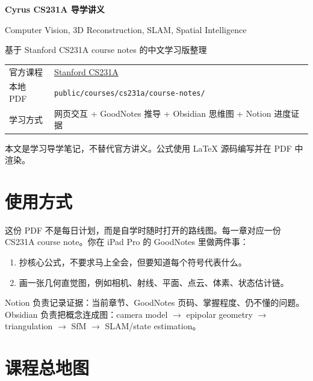 \documentclass[11pt]{article}
\begin{document}
\begin{titlepage}
  \centering
  {\sffamily\bfseries\Huge Cyrus CS231A 导学讲义\par}
  \vspace{0.8em}
  {\Large Computer Vision, 3D Reconstruction, SLAM, Spatial Intelligence\par}
  \vspace{1.2em}
  {\large 基于 Stanford CS231A course notes 的中文学习版整理\par}
  \vfill
  \begin{tabular}{ll}
    官方课程 & \href{https://web.stanford.edu/class/cs231a/}{Stanford CS231A} \\
    本地 PDF & \texttt{public/courses/cs231a/course-notes/} \\
    学习方式 & 网页交互 + GoodNotes 推导 + Obsidian 思维图 + Notion 进度证据 \\
  \end{tabular}
  \vfill
  {\small 本文是学习导学笔记，不替代官方讲义。公式使用 LaTeX 源码编写并在 PDF 中渲染。}
\end{titlepage}

\tableofcontents
\newpage

\section*{使用方式}

这份 PDF 不是每日计划，而是自学时随时打开的路线图。每一章对应一份 CS231A course note。你在 iPad Pro 的 GoodNotes 里做两件事：
\begin{enumerate}
  \item 抄核心公式，不要求马上全会，但要知道每个符号代表什么。
  \item 画一张几何直觉图，例如相机、射线、平面、点云、体素、状态估计链。
\end{enumerate}

Notion 负责记录证据：当前章节、GoodNotes 页码、掌握程度、仍不懂的问题。Obsidian 负责把概念连成图：camera model $\rightarrow$ epipolar geometry $\rightarrow$ triangulation $\rightarrow$ SfM $\rightarrow$ SLAM/state estimation。

\section{课程总地图}
\end{document}
